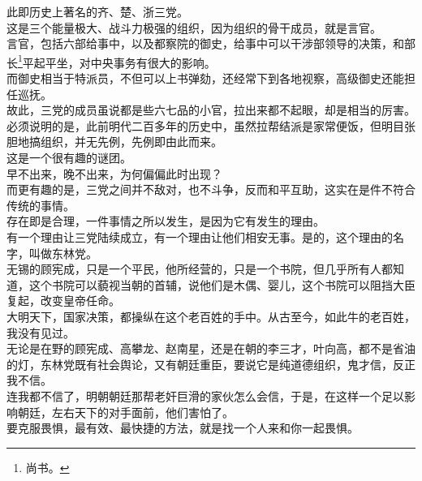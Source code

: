 \begin{multicols}{\theparacolNo}
此即历史上著名的齐、楚、浙三党。\\

这是三个能量极大、战斗力极强的组织，因为组织的骨干成员，就是言官。\\

言官，包括六部给事中，以及都察院的御史，给事中可以干涉部领导的决策，和部长\footnote{尚书。}平起平坐，对中央事务有很大的影响。\\

而御史相当于特派员，不但可以上书弹劾，还经常下到各地视察，高级御史还能担任巡抚。\\

故此，三党的成员虽说都是些六七品的小官，拉出来都不起眼，却是相当的厉害。\\

必须说明的是，此前明代二百多年的历史中，虽然拉帮结派是家常便饭，但明目张胆地搞组织，并无先例，先例即由此而来。\\

这是一个很有趣的谜团。\\

早不出来，晚不出来，为何偏偏此时出现？\\

而更有趣的是，三党之间并不敌对，也不斗争，反而和平互助，这实在是件不符合传统的事情。\\

存在即是合理，一件事情之所以发生，是因为它有发生的理由。\\

有一个理由让三党陆续成立，有一个理由让他们相安无事。是的，这个理由的名字，叫做东林党。\\

无锡的顾宪成，只是一个平民，他所经营的，只是一个书院，但几乎所有人都知道，这个书院可以藐视当朝的首辅，说他们是木偶、婴儿，这个书院可以阻挡大臣复起，改变皇帝任命。\\

大明天下，国家决策，都操纵在这个老百姓的手中。从古至今，如此牛的老百姓，我没有见过。\\

无论是在野的顾宪成、高攀龙、赵南星，还是在朝的李三才，叶向高，都不是省油的灯，东林党既有社会舆论，又有朝廷重臣，要说它是纯道德组织，鬼才信，反正我不信。\\

连我都不信了，明朝朝廷那帮老奸巨滑的家伙怎么会信，于是，在这样一个足以影响朝廷，左右天下的对手面前，他们害怕了。\\

要克服畏惧，最有效、最快捷的方法，就是找一个人来和你一起畏惧。\\


\end{multicols}
